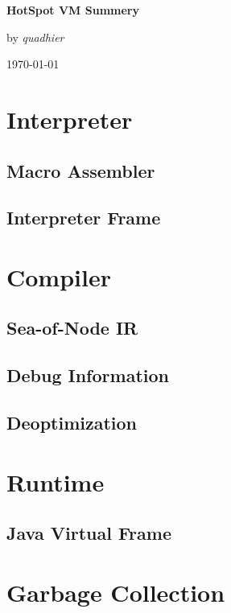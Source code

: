 \documentclass[UTF8]{ctexart}
\begin{document}
\begin{titlepage}
	\centering
  \vspace*{\fill}
	{\huge\bfseries HotSpot VM Summery\par}
  \vspace*{5cm}
  \vspace*{\fill}
  {\Large by \it{quadhier}\par}
	{\Large \today}
\end{titlepage}

\tableofcontents
\setcounter{page}{0}
\newpage


\section{Interpreter}
\subsection{Macro Assembler}
\lipsum
\subsection{Interpreter Frame}
\lipsum


\section{Compiler}
\subsection{Sea-of-Node IR}
\lipsum
\subsection{Debug Information}
\lipsum
\subsection{Deoptimization}
\lipsum


\section{Runtime}
\subsection{Java Virtual Frame}
\lipsum


\section{Garbage Collection}
\end{document}
